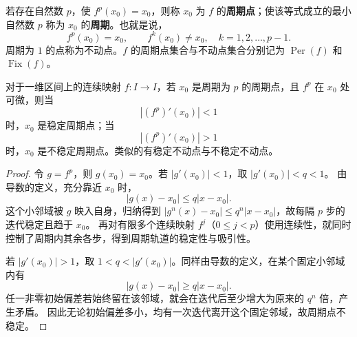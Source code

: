 若存在自然数 $p$，使 $f^p(x_0)=x_0$，则称 $x_0$ 为 $f$ 的\textbf{周期点}；使该等式成立的最小自然数 $p$ 称为 $x_0$ 的\textbf{周期}。也就是说，
\[
	f^p(x_0)=x_0,\qquad
	f^k(x_0)\ne x_0,\quad k=1,2,\ldots,p-1.
\]
周期为 $1$ 的点称为不动点。$f$ 的周期点集合与不动点集合分别记为 $\operatorname{Per}(f)$ 和 $\operatorname{Fix}(f)$。

\begin{proposition}[一维周期点的导数判据]\label{prop:discrete-derivative-test}
对于一维区间上的连续映射 $f:I\to I$，若 $x_0$ 是周期为 $p$ 的周期点，且 $f^p$ 在 $x_0$ 处可微，则当
\[
	\left|(f^p)'(x_0)\right|<1
\]
时，$x_0$ 是稳定周期点；当
\[
	\left|(f^p)'(x_0)\right|>1
\]
时，$x_0$ 是不稳定周期点。类似的有稳定不动点与不稳定不动点。
\end{proposition}
\begin{proof}
令 $g=f^p$，则 $g(x_0)=x_0$。若 $|g'(x_0)|<1$，取 $|g'(x_0)|<q<1$。
由导数的定义，充分靠近 $x_0$ 时，
\[
 |g(x)-x_0|\leq q|x-x_0|.
\]
这个小邻域被 $g$ 映入自身，归纳得到 $|g^n(x)-x_0|\leq q^n|x-x_0|$，故每隔 $p$ 步的迭代稳定且趋于 $x_0$。
再对有限多个连续映射 $f^j$（$0\leq j<p$）使用连续性，就同时控制了周期内其余各步，得到周期轨道的稳定性与吸引性。

若 $|g'(x_0)|>1$，取 $1<q<|g'(x_0)|$。同样由导数的定义，在某个固定小邻域内有
\[
 |g(x)-x_0|\geq q|x-x_0|.
\]
任一非零初始偏差若始终留在该邻域，就会在迭代后至少增大为原来的 $q^n$ 倍，产生矛盾。
因此无论初始偏差多小，均有一次迭代离开这个固定邻域，故周期点不稳定。
\end{proof}


